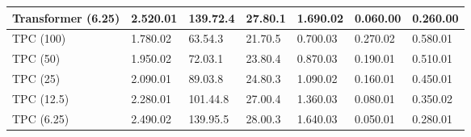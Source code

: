 \documentclass[sigconf]{acmart}
\begin{document}
\begin{table*}[ht]
\begin{tabular}{p{2.9cm}|p{1.3cm}p{1.3cm}p{1.3cm}p{1.3cm}p{1.3cm}p{1.3cm}}
        Transformer (6.25) & {2.520.01} & {139.72.4} & {27.80.1} & {1.690.02} & {0.060.00} & {0.260.00} \\
    \midrule
        TPC (100) & {1.780.02} & {63.54.3} & {21.70.5} & {0.700.03} & {0.270.02} & {0.580.01} \\
        TPC (50) & {1.950.02} & {72.03.1} & {23.80.4} & {0.870.03} & {0.190.01} & {0.510.01} \\
        TPC (25) & {2.090.01} & {89.03.8} & {24.80.3} & {1.090.02} & {0.160.01} & {0.450.01} \\
        TPC (12.5) & {2.280.01} & {101.44.8} & {27.00.4} & {1.360.03} & {0.080.01} & {0.350.02} \\
        TPC (6.25) & {2.490.02} & {139.95.5} & {28.00.3} & {1.640.03} & {0.050.01} & {0.280.01} \\
    \bottomrule
    \end{tabular}
\end{table*}
\end{document}
